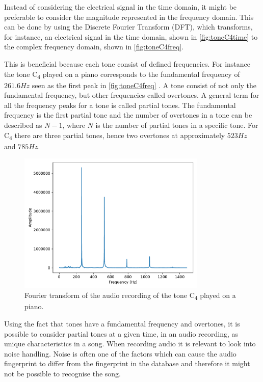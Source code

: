 Instead of considering the electrical signal in the time domain, it might be preferable to consider the magnitude represented in the frequency domain. This can be done by using the Discrete Fourier Transform (DFT), which transforms, for instance, an electrical signal in the time domain, shown in \autoref{fig:toneC4time} to the complex frequency domain, shown in \autoref{fig:toneC4freq}.

This is beneficial because each tone consist of defined frequencies. For instance the tone C\textsubscript{4} played on a piano corresponds to the fundamental frequency of $261.6 \si{Hz}$ seen as the first peak in \autoref{fig:toneC4freq} \cite[29]{Meinard2015Fundamentals}. A tone consist of not only the fundamental frequency, but other frequencies called overtones. A general term for all the frequency peaks for a tone is called partial tones. The fundamental frequency is the first partial tone and the number of overtones in a tone can be described as $N-1$, where $N$ is the number of partial tones in a specific tone. For C\textsubscript{4} there are three partial tones, hence two overtones at approximately $523 \si{Hz}$ and $ 785 \si{Hz}$. \cite[41]{Meinard2015Fundamentals}
\begin{figure}[H]
    \centering
    \includegraphics[width=0.8\textwidth]{figures/C4freq.pdf}
    \caption{Fourier transform of the audio recording of the tone C\textsubscript{4} played on a piano.}
    \label{fig:toneC4freq}
\end{figure}
Using the fact that tones have a fundamental frequency and overtones, it is possible to consider partial tones at a given time, in an audio recording, as unique characteristics in a song. When recording audio it is relevant to look into noise handling. Noise is often one of the factors which can cause the audio fingerprint to differ from the fingerprint in the database and therefore it might not be possible to recognise the song.\\

